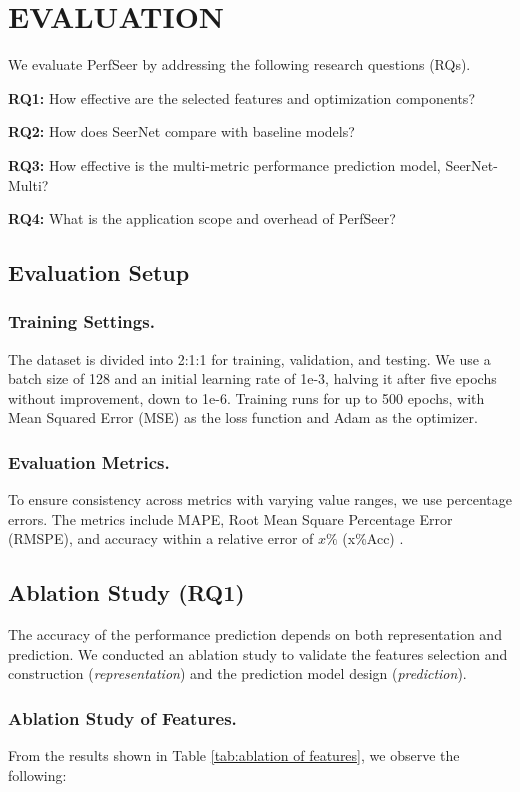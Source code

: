 
\section{EVALUATION}
We evaluate PerfSeer by addressing the following research questions (RQs).

\textbf{RQ1:} How effective are the selected features and optimization components? 

\textbf{RQ2:} How does SeerNet compare with baseline models? 

\textbf{RQ3:} How effective is the multi-metric performance prediction model, SeerNet-Multi? 

\textbf{RQ4:} What is the application scope and overhead of PerfSeer? 

\subsection{Evaluation Setup}
\subsubsection{Training Settings.}\label{sec:train-setting}
The dataset is divided into 2:1:1 for training, validation, and testing. We use a batch size of 128 and an initial learning rate of 1e-3, halving it after five epochs without improvement, down to 1e-6. Training runs for up to 500 epochs, with Mean Squared Error (MSE) as the loss function and Adam as the optimizer.

\subsubsection{Evaluation Metrics.}\label{sec:metrics}
To ensure consistency across metrics with varying value ranges, we use percentage errors. The metrics include MAPE, Root Mean Square Percentage Error (RMSPE), and accuracy within a relative error of \(x\%\) (x\%Acc) \cite{Brp-nas}.

\subsection{Ablation Study (RQ1)}\label{sec:ablation}
The accuracy of the performance prediction depends on both representation and prediction. We conducted an ablation study to validate the features selection and construction (\emph{representation}) and the prediction model design (\emph{prediction}).
\subsubsection{Ablation Study of Features.} \label{sec:features ablation}
From the results shown in Table \ref{tab:ablation of features}, we observe the following:

